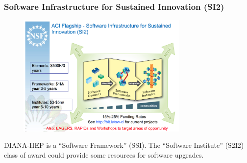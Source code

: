 \begin{frame}
\frametitle{Software Infrastructure for Sustained Innovation (SI2)}

\begin{figure}[htbp]
\begin{center}
\includegraphics[width=0.75\textwidth]{images/ramnath-si2-pi-meeting-2016.png}
\label{fig:nsfsi2}
\end{center}
\end{figure}

DIANA-HEP is a ``Software Framework'' (SSI).  The ``Software Institute'' (S2I2) class of award could provide some resources for software upgrades.

\end{frame}


